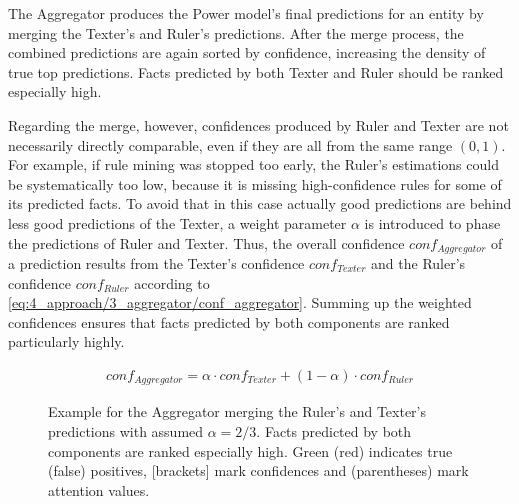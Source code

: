 The Aggregator produces the Power model's final predictions for an entity by merging the Texter's and Ruler's predictions. After the merge process, the combined predictions are again sorted by confidence, increasing the density of true top predictions. Facts predicted by both Texter and Ruler should be ranked especially high.

Regarding the merge, however, confidences produced by Ruler and Texter are not necessarily directly comparable, even if they are all from the same range $(0, 1)$. For example, if rule mining was stopped too early, the Ruler's estimations could be systematically too low, because it is missing high-confidence rules for some of its predicted facts. To avoid that in this case actually good predictions are behind less good predictions of the Texter, a weight parameter $\alpha$ is introduced to phase the predictions of Ruler and Texter. Thus, the overall confidence $conf_{Aggregator}$ of a prediction results from the Texter's confidence $conf_{Texter}$ and the Ruler's confidence $conf_{Ruler}$ according to \autoref{eq:4_approach/3_aggregator/conf_aggregator}. Summing up the weighted confidences ensures that facts predicted by both components are ranked particularly highly.

\begin{align}
    conf_{Aggregator} = \alpha \cdot conf_{Texter} + (1 - \alpha) \cdot conf_{Ruler}
    \label{eq:4_approach/3_aggregator/conf_aggregator}
\end{align}

\begin{figure}[t]
    \caption{Example for the Aggregator merging the Ruler's and Texter's predictions with assumed $\alpha = 2/3$. Facts predicted by both components are ranked especially high. Green (red) indicates true (false) positives, [brackets] mark confidences and (parentheses) mark attention values.}
    \label{fig:4_approach/3_aggregator/lucy}
\end{figure}

